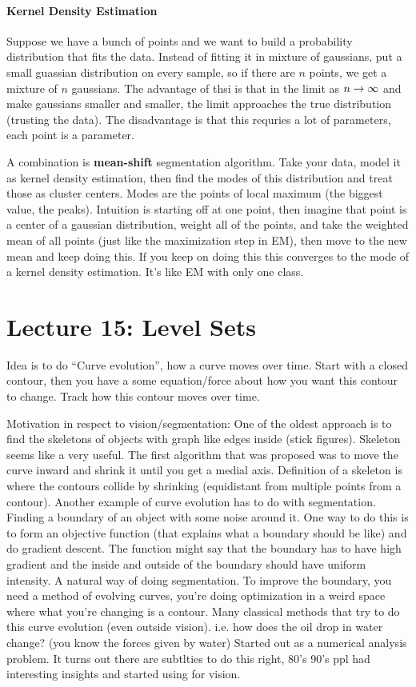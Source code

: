 \paragraph{Kernel Density Estimation}
\label{sec:kern-dens-estim}
Suppose we have a bunch of points and we want to build a probability
distribution that fits the data. Instead of fitting it in mixture of
gaussians, put a small guassian distribution on every sample, so if
there are $n$ points, we get a mixture of $n$ gaussians. The advantage
of thsi is that in the limit as $n \rightarrow \infty$ and make gaussians
smaller and smaller, the limit approaches the true distribution
(trusting the data). The disadvantage is that this requries a lot of
parameters, each point is a parameter.

A combination is \textbf{mean-shift} segmentation algorithm. Take your
data, model it as kernel density estimation, then find the modes of
this distribution and treat those as cluster centers. Modes are the
points of local maximum (the biggest value, the peaks). Intuition is
starting off at one point, then imagine that point is a center of a
gaussian distribution, weight all of the points, and take the weighted
mean of all points (just like the maximization step in EM), then move
to the new mean and keep doing this. If you keep on doing this this
converges to the mode of a kernel density estimation. It's like EM
with only one class. 

\pagebreak

\section{Lecture 15: Level Sets}
\label{sec:lecture-15}
Idea is to do ``Curve evolution'', how a curve moves over time. Start
with a closed contour, then you have a some equation/force about how you
want this contour to change. Track how this contour moves over time.

Motivation in respect to vision/segmentation: One of the oldest approach is to
find the skeletons of objects with graph like edges inside (stick
figures). Skeleton seems like a very useful. The first algorithm that
was proposed was to move the curve inward and shrink it until you get
a medial axis. Definition of a skeleton is where the contours collide
by shrinking (equidistant from multiple points from a
contour). Another example of curve evolution has to do with
segmentation. Finding a boundary of an object with some noise around
it. One way to do this is to form an objective function (that explains
what a boundary should be like) and do gradient descent. The function
might say that the boundary has to have high gradient and the inside
and outside of the boundary should have uniform intensity.  A natural
way of doing segmentation. To improve the boundary, you need a method
of evolving curves, you're doing optimization in a weird space where
what you're changing is a contour. Many classical methods that try to
do this curve evolution (even outside vision). i.e. how does the oil
drop in water change? (you know the forces given by water) Started out
as a numerical analysis problem. It turns out there are subtlties
to do this right, 80's 90's ppl had interesting insights and started
using for vision.

